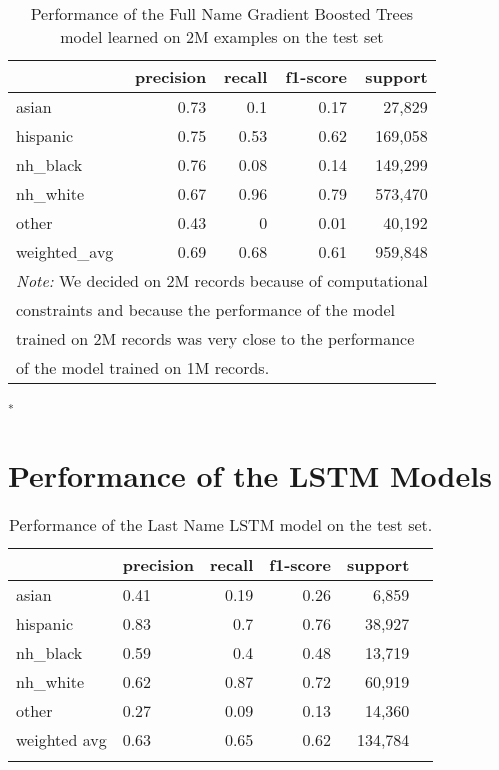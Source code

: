 \documentclass[12pt, letterpaper]{article}
\begin{document}
\begin{table}[h!]
\centering
\caption{Performance of the Full Name Gradient Boosted Trees model learned on 2M examples on the test set}
\begin{tabular}{lrrrr}
\hline
              &   precision &   recall &   f1-score &   support \\
\hline
 asian        &        0.73 &     0.1  &       0.17 &     27,829 \\
 hispanic     &        0.75 &     0.53 &       0.62 &    169,058 \\
 nh\_black     &        0.76 &     0.08 &       0.14 &    149,299 \\
 nh\_white     &        0.67 &     0.96 &       0.79 &    573,470 \\
 other        &        0.43 &     0    &       0.01 &     40,192 \\
 weighted\_avg &        0.69 &     0.68 &       0.61 &    959,848 \\
\hline
\multicolumn{5}{l}{\textit{Note:} We decided on 2M records because of computational}\\
\multicolumn{5}{l}{constraints and because the performance of the model}\\
\multicolumn{5}{l}{trained on 2M records was very close to the performance}\\
\multicolumn{5}{l}{of the model trained on 1M records.}
\end{tabular}
\label{table:gb_full_name_2m}
\end{table}

\singlespacing
\textsuperscript{*} 
\doublespacing

\clearpage
\section{Performance of the LSTM Models}\label{lstm_perf}

\begin{table}[h!]
\centering
\caption{Performance of the Last Name LSTM model on the test set.}
\begin{tabular}{llrrrr}
\hline
          & precision   &    recall &   f1-score &   support \\
\hline
 asian    & 0.41        &      0.19 &       0.26 &   6,859    \\
 hispanic & 0.83        &      0.7  &       0.76 &  38,927    \\
 nh\_black & 0.59        &      0.4  &       0.48 &  13,719    \\
 nh\_white & 0.62        &      0.87 &       0.72 &  60,919    \\
 other    & 0.27        &      0.09 &       0.13 &  14,360    \\
 weighted avg         &      0.63 &       0.65 & 0.62 & 134,784\\
\hline
\label{table:lstm_last_name}
\end{tabular}
\end{table}
\end{document}
